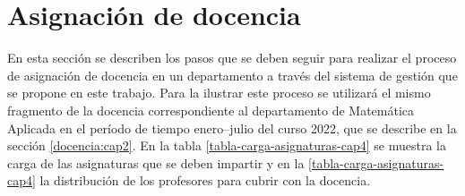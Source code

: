 \section{Asignación de docencia}\label{cap4:docencia}




En esta sección se describen los pasos que se deben seguir para realizar 
el proceso de asignación de docencia en un departamento a través del sistema 
de gestión que se propone en este trabajo. 
Para la ilustrar este proceso se utilizará 
el mismo fragmento de la docencia correspondiente al departamento
de Matemática Aplicada en el período de tiempo 
enero--julio del curso 2022, que se describe en la sección \ref{docencia:cap2}. 
En la tabla \ref{tabla-carga-asignaturas-cap4} 
se muestra la carga de las asignaturas que se deben impartir
y en la \ref{tabla-carga-asignaturas-cap4} 
la distribución de los profesores
para cubrir con la docencia. 


